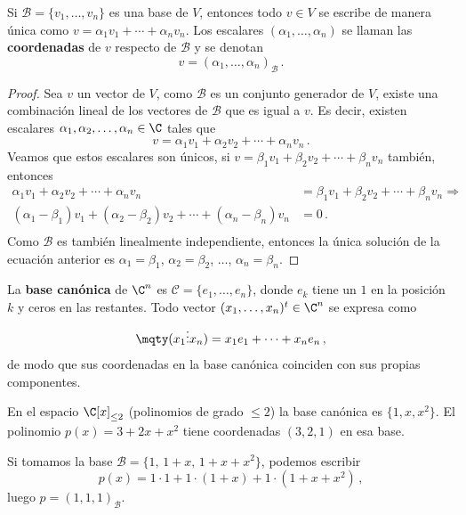 \begin{theo}
  Si $\mathcal{B}=\{v_1,\ldots,v_n\}$ es una base de $V$, entonces todo $v\in V$ se escribe de manera única como $v = \alpha_1 v_1+\cdots+\alpha_n v_n$. Los escalares $(\alpha_1,\ldots,\alpha_n)$ se llaman las \textbf{coordenadas} de $v$ respecto de $\mathcal{B}$ y se denotan
  \[
    v = (\alpha_1,\ldots,\alpha_n)_{\mathcal{B}}\,.
  \]
\end{theo}
\begin{proof}
  Sea $v$ un vector de $V$, como $\mathcal{B}$ es un conjunto generador de $V$, existe una combinación lineal de los vectores de $\mathcal{B}$ que es igual a $v$. Es decir, existen escalares $\alpha_1, \alpha_2, \ldots, \alpha_n \in \C$ tales que
  $$v = \alpha_1 v_1 + \alpha_2 v_2 + \cdots + \alpha_n v_n\,.$$
  Veamos que estos escalares son únicos, si $v = \beta_1 v_1 + \beta_2 v_2 + \cdots + \beta_n v_n$ también, entonces
  \begin{align*}
    \alpha_1 v_1 + \alpha_2 v_2 + \cdots + \alpha_n v_n                               & = \beta_1 v_1 + \beta_2 v_2 + \cdots + \beta_n v_n \Rightarrow \\
    (\alpha_1-\beta_1) v_1 + (\alpha_2-\beta_2) v_2 + \cdots + (\alpha_n-\beta_n) v_n & = 0 \,.                                                        \\
  \end{align*}
  Como $\mathcal{B}$ es también linealmente independiente, entonces la única solución de la ecuación anterior es $\alpha_1 = \beta_1$, $\alpha_2 = \beta_2$, $\ldots$, $\alpha_n = \beta_n$.
\end{proof}

\begin{eje}
  La \textbf{base canónica} de $\C^n$ es $\mathcal{C}=\{e_1,\ldots,e_n\}$, donde $e_k$ tiene un $1$ en la posición $k$ y ceros en las restantes. Todo vector $(x_1,\ldots,x_n)^t\in\C^n$ se expresa como
  \[
    \mqty(x_1\\\vdots\\x_n) = x_1 e_1 + \cdots + x_n e_n\,,
  \]
  de modo que sus coordenadas en la base canónica coinciden con sus propias componentes.
\end{eje}

\begin{eje}
  En el espacio $\C[x]_{\leq 2}$ (polinomios de grado $\leq 2$) la base canónica es $\{1,x,x^2\}$. El polinomio $p(x)=3+2x+x^2$ tiene coordenadas $(3,2,1)$ en esa base.

  Si tomamos la base $\mathcal{B}=\{1,\, 1+x,\, 1+x+x^2\}$, podemos escribir
  \[
    p(x) = 1\cdot 1 + 1\cdot(1+x) + 1\cdot(1+x+x^2)\,,
  \]
  luego $p = (1,1,1)_{\mathcal{B}}$.
\end{eje}

